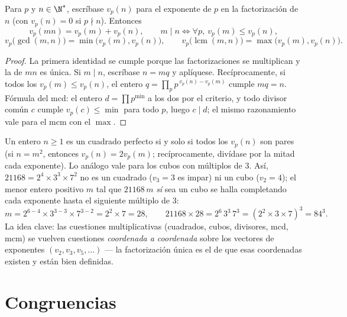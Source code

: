 \begin{proposition}[Valuaciones]\label{prop:b1:arith:valuation}
Para $p$  y $n \in \N^*$, escríbase $v_p(n)$ para el exponente de $p$ en la
factorización de $n$ (con $v_p(n) = 0$ si $p \nmid n$). Entonces
\[
v_p(mn) = v_p(m) + v_p(n),
\qquad
m \mid n \iff \forall p,\ v_p(m) \leq v_p(n),
\]
\[
v_p\bigl(\gcd(m,n)\bigr) = \min\bigl(v_p(m), v_p(n)\bigr),
\qquad
v_p\bigl(\operatorname{lcm}(m,n)\bigr) = \max\bigl(v_p(m),
v_p(n)\bigr).
\]
\end{proposition}

\begin{proof}
La primera identidad se cumple porque las factorizaciones se
multiplican y la de $mn$ es única. Si $m \mid n$, escríbase $n = mq$ y
aplíquese. Recíprocamente, si todos los $v_p(m) \leq v_p(n)$, el
entero $q = \prod_p p^{\,v_p(n) - v_p(m)}$ cumple $mq = n$. Fórmula
del mcd: el entero $d = \prod p^{\min}$  a los dos por el
criterio, y todo divisor común $c$ cumple $v_p(c) \leq \min$ para todo
$p$, luego $c \mid d$; el mismo razonamiento vale para el mcm con el
$\max$.
\end{proof}

\begin{example}\label{ex:b1:arith:squarecube}
Un entero $n \geq 1$ es un cuadrado perfecto si y solo si todos los
$v_p(n)$ son pares (si $n = m^2$, entonces $v_p(n) = 2v_p(m)$;
recíprocamente, divídase por la mitad cada exponente). Lo análogo vale
para los cubos con múltiplos de $3$. Así, $21168 = 2^4 \times 3^3
\times 7^2$ no es un cuadrado ($v_3 = 3$ es impar) ni un cubo
($v_2 = 4$); el menor entero positivo $m$ tal que $21168\,m$ \emph{sí}
sea un cubo se halla completando cada exponente hasta el siguiente
múltiplo de $3$:
\[
m = 2^{6-4} \times 3^{3-3} \times 7^{3-2} = 2^2 \times 7 = 28,
\qquad
21168 \times 28 = 2^6\,3^3\,7^3 = (2^2 \times 3 \times 7)^3
= 84^3 .
\]
La idea clave: las cuestiones multiplicativas (cuadrados, cubos,
divisores, mcd, mcm) se vuelven cuestiones \emph{coordenada a
coordenada} sobre los vectores de exponentes $(v_2, v_3, v_5, \dots)$
--- la factorización única es el  de que esas coordenadas
existen y están bien definidas.
\end{example}

\section{Congruencias}

